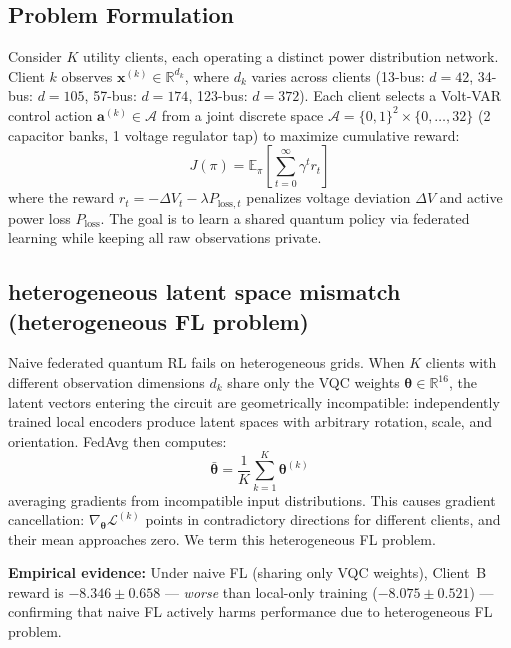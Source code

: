 \documentclass[journal]{IEEEtran}
\begin{document}
\subsection{Problem Formulation}

Consider $K$ utility clients, each operating a distinct power distribution
network. Client $k$ observes $\mathbf{x}^{(k)} \in \mathbb{R}^{d_k}$,
where $d_k$ varies across clients (13-bus: $d=42$, 34-bus: $d=105$,
57-bus: $d=174$, 123-bus: $d=372$). Each client selects a Volt-VAR
control action $\mathbf{a}^{(k)} \in \mathcal{A}$ from a joint discrete
space $\mathcal{A} = \{0,1\}^2 \times \{0,\ldots,32\}$ (2 capacitor banks,
1 voltage regulator tap) to maximize cumulative reward:
%
\begin{equation}
    J(\pi) = \mathbb{E}_\pi\!\left[\sum_{t=0}^{\infty} \gamma^t r_t\right]
\end{equation}
%
where the reward $r_t = -\Delta V_t - \lambda P_{\text{loss},t}$ penalizes
voltage deviation $\Delta V$ and active power loss $P_{\text{loss}}$.
The goal is to learn a shared quantum policy via federated learning
while keeping all raw observations private.

\subsection{heterogeneous latent space mismatch (heterogeneous FL problem)}

Naive federated quantum RL fails on heterogeneous grids.
When $K$ clients with different observation dimensions $d_k$ share
only the VQC weights $\boldsymbol{\theta} \in \mathbb{R}^{16}$,
the latent vectors entering the circuit are geometrically incompatible:
independently trained local encoders produce latent spaces with arbitrary
rotation, scale, and orientation. FedAvg then computes:
%
\begin{equation}
    \bar{\boldsymbol{\theta}} = \frac{1}{K}\sum_{k=1}^{K} \boldsymbol{\theta}^{(k)}
\end{equation}
%
averaging gradients from incompatible input distributions.
This causes gradient cancellation: $\nabla_{\boldsymbol{\theta}}
\mathcal{L}^{(k)}$ points in contradictory directions for different clients,
and their mean approaches zero. We term this heterogeneous FL problem.

\textbf{Empirical evidence:} Under naive FL (sharing only VQC weights),
Client~B reward is $-8.346 \pm 0.658$ --- \textit{worse} than local-only
training ($-8.075 \pm 0.521$) --- confirming that naive FL actively harms
performance due to heterogeneous FL problem.
\end{document}
